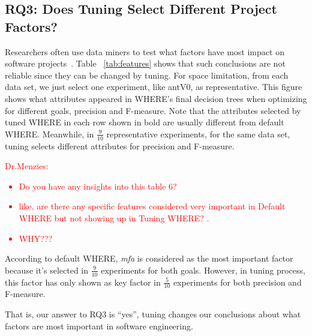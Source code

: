 \documentclass{sig-alternative}
\newcommand{\Menzies}[1]{\textcolor{red}{Dr.Menzies: #1}}
\newcommand{\tab}[1]{Table ~\ref{tab:#1}}
\begin{document}
\subsection{RQ3: Does Tuning Select Different Project Factors? }\label{sect:import}


Researchers often use data miners to  test what factors have most impact on software projects~\cite{bell2013limited,rahman2013how,me02k,moser2008comparative,zimmermann2007predicting,herzig2013predicting}. 
\tab{features} shows that such conclusions are not reliable since they can be changed by tuning. For space limitation, from each data set, we just select one experiment, like antV0, as representative. 
This figure shows what attributes appeared in WHERE's final decision trees when optimizing for different goals, precision and F-measure. Note that the attributes selected by tuned WHERE in each row shown in bold are usually different from default WHERE. Meanwhile, in $\frac{9}{10}$ representative experiments, for the same data set, tuning selects different attributes for precision and F-measure.

\Menzies{
\begin{itemize}
\item Do you have any insights into this table 6?
\item like, are there any specific features considered very important in Default WHERE but not showing up in Tuning WHERE? . 
\item WHY???
\end{itemize}
}
According to default WHERE, {\it mfa} is considered as the most important factor because it's selected in $\frac{9}{10}$ experiments for both goals. However, in tuning process, this factor has only shown as key factor in $\frac{5}{10}$ experiments for both precision and F-measure. 

That is, our answer to RQ3 is ``yes'', tuning changes our
conclusions about what factors are most important in software engineering.
\end{document}
